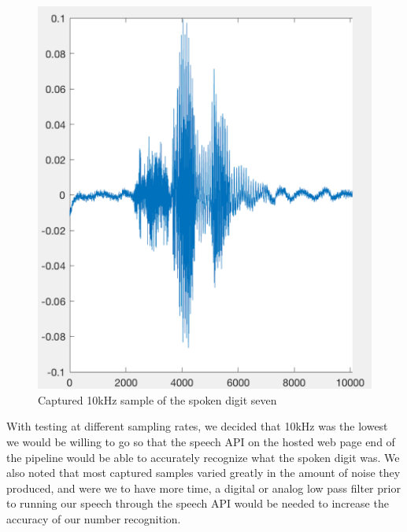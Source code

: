 \begin{figure}[h]
	\begin{center}
		\includegraphics[scale=0.5]{speech_seven}
	\end{center}
	\caption{Captured 10kHz sample of the spoken digit seven}\label{fig:speechseven}
\end{figure}

With testing at different sampling rates, we decided that 10kHz was the lowest we would be willing to go so that the speech API on the hosted web page end of the pipeline would be able to accurately recognize what the spoken digit was. We also noted that most captured samples varied greatly in the amount of noise they produced, and were we to have more time, a digital or analog low pass filter prior to running our speech through the speech API would be needed to increase the accuracy of our number recognition.



